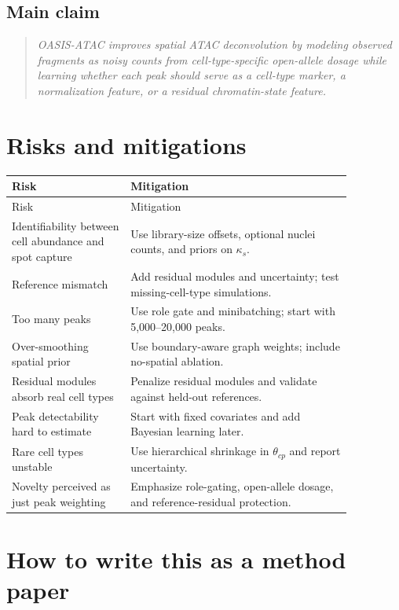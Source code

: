 \documentclass[11pt]{article}
\begin{document}
\subsection{Main claim}

\begin{quote}
\textit{OASIS-ATAC improves spatial ATAC deconvolution by modeling observed fragments as noisy counts from cell-type-specific open-allele dosage while learning whether each peak should serve as a cell-type marker, a normalization feature, or a residual chromatin-state feature.}
\end{quote}

\section{Risks and mitigations}

\begin{longtable}{p{0.30\linewidth}p{0.56\linewidth}}
\toprule
Risk & Mitigation \\
\midrule
\endfirsthead
\toprule
Risk & Mitigation \\
\midrule
\endhead
Identifiability between cell abundance and spot capture & Use library-size offsets, optional nuclei counts, and priors on $\kappa_s$. \\
Reference mismatch & Add residual modules and uncertainty; test missing-cell-type simulations. \\
Too many peaks & Use role gate and minibatching; start with 5,000--20,000 peaks. \\
Over-smoothing spatial prior & Use boundary-aware graph weights; include no-spatial ablation. \\
Residual modules absorb real cell types & Penalize residual modules and validate against held-out references. \\
Peak detectability hard to estimate & Start with fixed covariates and add Bayesian learning later. \\
Rare cell types unstable & Use hierarchical shrinkage in $\theta_{cp}$ and report uncertainty. \\
Novelty perceived as just peak weighting & Emphasize role-gating, open-allele dosage, and reference-residual protection. \\
\bottomrule
\end{longtable}

\section{How to write this as a method paper}
\end{document}
